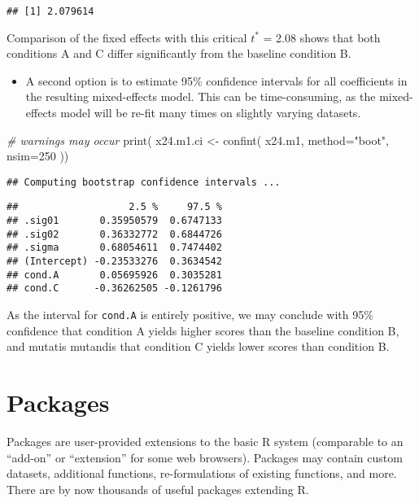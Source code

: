 \documentclass[
]{book}
\newenvironment{Shaded}{\begin{snugshade}}{\end{snugshade}}
\newcommand{\AttributeTok}[1]{\textcolor[rgb]{0.77,0.63,0.00}{#1}}
\newcommand{\CommentTok}[1]{\textcolor[rgb]{0.56,0.35,0.01}{\textit{#1}}}
\newcommand{\DecValTok}[1]{\textcolor[rgb]{0.00,0.00,0.81}{#1}}
\newcommand{\FunctionTok}[1]{\textcolor[rgb]{0.00,0.00,0.00}{#1}}
\newcommand{\NormalTok}[1]{#1}
\newcommand{\OtherTok}[1]{\textcolor[rgb]{0.56,0.35,0.01}{#1}}
\newcommand{\StringTok}[1]{\textcolor[rgb]{0.31,0.60,0.02}{#1}}
\providecommand{\tightlist}{%
  \setlength{\itemsep}{0pt}\setlength{\parskip}{0pt}}
\begin{document}
\begin{verbatim}
## [1] 2.079614
\end{verbatim}

Comparison of the fixed effects with this critical \(t^*\) = 2.08 shows that
both conditions A and C differ significantly from the baseline condition
B.

\begin{itemize}
\tightlist
\item
  A second option is to estimate 95\% confidence intervals for all
  coefficients in the resulting mixed-effects model. This can be
  time-consuming, as the mixed-effects model will be re-fit many times on
  slightly varying datasets.
\end{itemize}

\begin{Shaded}
\begin{Highlighting}[]
\CommentTok{\# warnings may occur}
\FunctionTok{print}\NormalTok{( x24.m1.ci }\OtherTok{\textless{}{-}} \FunctionTok{confint}\NormalTok{( x24.m1, }\AttributeTok{method=}\StringTok{"boot"}\NormalTok{, }\AttributeTok{nsim=}\DecValTok{250}\NormalTok{ ))}
\end{Highlighting}
\end{Shaded}

\begin{verbatim}
## Computing bootstrap confidence intervals ...
\end{verbatim}

\begin{verbatim}
##                   2.5 %     97.5 %
## .sig01       0.35950579  0.6747133
## .sig02       0.36332772  0.6844726
## .sigma       0.68054611  0.7474402
## (Intercept) -0.23533276  0.3634542
## cond.A       0.05695926  0.3035281
## cond.C      -0.36262505 -0.1261796
\end{verbatim}

As the interval for \texttt{cond.A} is entirely
positive, we may conclude with 95\% confidence that condition A yields
higher scores than the baseline condition B, and mutatis mutandis that
condition C yields lower scores than condition B.

\hypertarget{ch-packages}{%
\chapter{Packages}\label{ch-packages}}

Packages are user-provided extensions to the basic R
system (comparable to an ``add-on'' or ``extension'' for some web browsers).
Packages
may contain custom datasets, additional functions, re-formulations of
existing functions, and more. There are by now thousands of useful
packages extending R.
\end{document}
